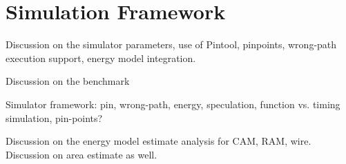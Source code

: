 \section{Simulation Framework}
\label{sec:simulation}

Discussion on the simulator parameters, use of Pintool, pinpoints, wrong-path
execution support, energy model integration.

Discussion on the benchmark

Simulator framework: pin, wrong-path, energy, speculation, function vs. timing
simulation, pin-points?

Discussion on the energy model estimate analysis for CAM, RAM, wire. Discussion
on area estimate as well.
